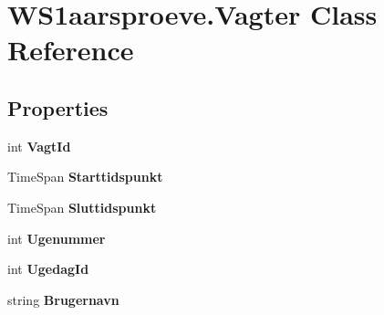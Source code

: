\hypertarget{class_w_s1aarsproeve_1_1_vagter}{}\section{W\+S1aarsproeve.\+Vagter Class Reference}
\label{class_w_s1aarsproeve_1_1_vagter}
\subsection*{Properties}
\begin{DoxyCompactItemize}
\item 
\hypertarget{class_w_s1aarsproeve_1_1_vagter_a5de3fe31711281c3d6521e08c6f58530}{}int {\bfseries Vagt\+Id}\label{class_w_s1aarsproeve_1_1_vagter_a5de3fe31711281c3d6521e08c6f58530}

\item 
\hypertarget{class_w_s1aarsproeve_1_1_vagter_a3c54cb29e21c37ebcdae44a8cf5e7d91}{}Time\+Span {\bfseries Starttidspunkt}\label{class_w_s1aarsproeve_1_1_vagter_a3c54cb29e21c37ebcdae44a8cf5e7d91}

\item 
\hypertarget{class_w_s1aarsproeve_1_1_vagter_a736d0f9772a94cc7e5ff7038a9318cd5}{}Time\+Span {\bfseries Sluttidspunkt}\label{class_w_s1aarsproeve_1_1_vagter_a736d0f9772a94cc7e5ff7038a9318cd5}

\item 
\hypertarget{class_w_s1aarsproeve_1_1_vagter_ae2dd2cdfdf6d53c3f0c9aa3089812b26}{}int {\bfseries Ugenummer}\label{class_w_s1aarsproeve_1_1_vagter_ae2dd2cdfdf6d53c3f0c9aa3089812b26}

\item 
\hypertarget{class_w_s1aarsproeve_1_1_vagter_a45fcfd5d2b97500c16ffbd8797611a6c}{}int {\bfseries Ugedag\+Id}\label{class_w_s1aarsproeve_1_1_vagter_a45fcfd5d2b97500c16ffbd8797611a6c}

\item 
\hypertarget{class_w_s1aarsproeve_1_1_vagter_aeb42a04e18f69426631f92c538633567}{}string {\bfseries Brugernavn}\label{class_w_s1aarsproeve_1_1_vagter_aeb42a04e18f69426631f92c538633567}


\end{DoxyCompactItemize}
